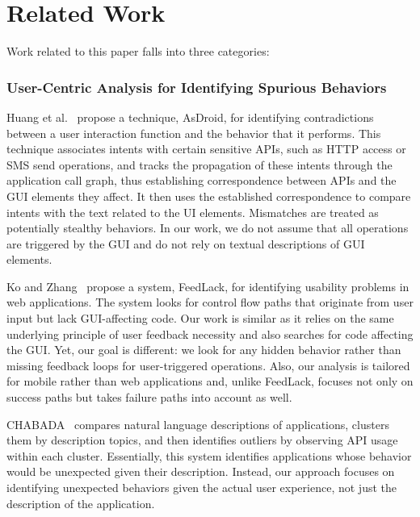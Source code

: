 \section{Related Work}
\label{sec:related}
Work related to this paper falls into three categories:

\vspace{-0.05in}
\subsubsection{User-Centric Analysis for Identifying Spurious Behaviors}
Huang et al.~\cite{Huang:Zhang:Tan:Wang:Liang:ICSE14} propose a technique, AsDroid, for identifying contradictions between a user interaction function and the behavior that it performs. 
This technique associates intents with certain sensitive APIs, such as HTTP access or SMS send operations, and tracks the propagation
of these intents through the application call graph, thus establishing correspondence between APIs and the GUI elements they affect. 
It then uses the established correspondence to compare intents with the text related to the UI elements. Mismatches are treated as potentially stealthy behaviors. 
In our work, we do not assume that all operations are triggered by the GUI
and do not rely on textual descriptions of GUI elements.

Ko and Zhang~\cite{Ko:Zhang:CHI11} propose a system, FeedLack, for identifying usability problems in web applications. The system looks for control flow paths that originate from user input but lack GUI-affecting code. Our work is similar as it relies on the same underlying principle 
of user feedback necessity and also searches for code affecting the GUI. Yet, our goal is different: we look for any hidden behavior rather than missing feedback loops for user-triggered operations. Also, our analysis is tailored for mobile rather than web applications and, unlike FeedLack, focuses not only on success paths but takes failure paths into account as well.   

CHABADA~\cite{Gorla:Tavecchia:Gross:Zeller:ICSE14} compares natural language descriptions of applications, clusters them by description topics, and then identifies outliers by observing API usage within each cluster. Essentially, this system identifies applications whose behavior would be unexpected given their description. Instead, our approach focuses on identifying unexpected behaviors given the actual user experience, not just the description of the application.

